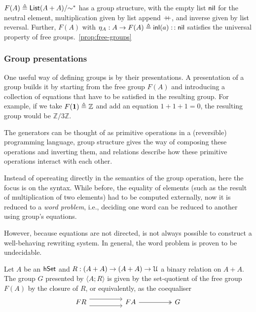 \begin{proposition}
  $F(A) \defeq \quot{\List[A + A]}{\sim^{\ast}}$ has a group structure, with the
  empty list $\operatorname{\mathsf{nil}}$ for the neutral element, multiplication given by list append
  $\mathbin{+\kern -0.4em+}$, and inverse given by list reversal. Further, $F(A)$ with $\eta_A :
    A \to F(A) \mathrel{\triangleq} \operatorname{\mathsf{inl}}(a) \mathrel{\operatorname{\mathsf{::}}} \operatorname{\mathsf{nil}}$ satisfies the universal property of free
  groups.~\cref{prop:free-groups}
\end{proposition}

\subsubsection{Group presentations}

One useful way of defining groups is by their presentations. A presentation of a
group builds it by starting from the free group $F(A)$ and introducing a
collection of equations that have to be satisfied in the resulting group. For
example, if we take $F({\mathbf{1}}) \mathrel{\triangleq} \mathbb{Z}$ and add an equation $1 + 1 + 1
  = 0$, the resulting group would be $\mathbb{Z}/3\mathbb{Z}$.

The generators can be thought of as primitive operations in a (reversible)
programming language, group structure gives the way of composing these
operations and inverting them, and relations describe how these primitive
operations interact with each other.

Instead of opereating directly in the semantics of the group operation, here the
focus is on the syntax. While before, the equality of elements (such as the
result of multiplication of two elements) had to be computed externally, now it is
reduced to a \emph{word problem}, i.e., deciding one word can be reduced to another
using group's equations.

However, because equations are not directed, is not always possible to construct a
well-behaving rewriting system. In general, the word problem is proven to be undecidable.


\begin{definition}
  Let $A$ be an $\mathsf{hSet}$ and $R : (A + A) \to (A + A) \to \UU$ a binary relation
  on $A + A$. The group $G$ presented by $\langle A ; R \rangle$ is given by the
  set-quotient of the free group $F(A)$ by the closure of $R$, or equivalently,
  as the coequaliser
  \[\begin{tikzcd}
      FR && FA && G
      \arrow[shift right=2, from=1-1, to=1-3]
      \arrow[shift left=2, from=1-1, to=1-3]
      \arrow[two heads, from=1-3, to=1-5]
    \end{tikzcd}\]
\end{definition}

